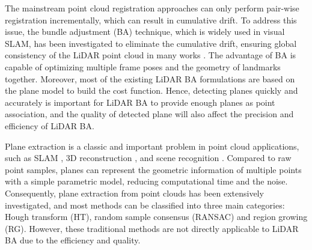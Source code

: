 \documentclass[letterpaper, 10 pt, conference]{ieeeconf}  %
\begin{document}

{The mainstream point cloud registration approaches} \cite{besl1992method, segal2009generalized, biber2003normal} {can only perform pair-wise registration incrementally, which can result in cumulative drift.} To address this issue, the bundle adjustment (BA) technique, which is widely used in visual SLAM, has been investigated to eliminate the cumulative drift, ensuring global consistency of the LiDAR point cloud in many works \cite{liu2022efficient, zhou2020efficient, ferrer2019eigen, huang2021bundle, liu2021balm}. The advantage of BA is capable of optimizing multiple frame poses and the geometry of landmarks together. Moreover, most of the existing LiDAR BA formulations are based on the plane model to build the cost function. Hence, detecting planes quickly and accurately is important for LiDAR BA to provide enough planes as point association, and the quality of detected plane will also affect the precision and efficiency of LiDAR BA. 


Plane extraction is a classic and important problem in point cloud applications, such as SLAM \cite{behley2018efficient, yuan2022efficient}, 3D reconstruction \cite{vizzo2021poisson}, and scene recognition \cite{el2019rgb}. Compared to raw point samples, planes can represent the geometric information of multiple points with a simple parametric model, reducing computational time and the noise. Consequently, plane extraction from point clouds has been extensively investigated, and most methods can be classified into three main categories: Hough transform (HT), random sample consensus (RANSAC) and region growing (RG). However, these traditional methods are not directly applicable to LiDAR BA due to the efficiency and quality.
\end{document}
